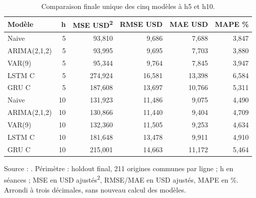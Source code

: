 \begin{table}[!htbp]
\centering
\caption{Comparaison finale unique des cinq modèles à h5 et h10.}
\label{tab:final_metrics}
\small
\setlength{\tabcolsep}{4pt}
\renewcommand{\arraystretch}{1.16}
\begin{tabularx}{\linewidth}{Xrrrrr}
\toprule
\textbf{Modèle} & \textbf{h} & \textbf{MSE USD\textsuperscript{2}} & \textbf{RMSE USD} & \textbf{MAE USD} & \textbf{MAPE \%} \\
\midrule
Naive & 5 & 93,810 & 9,686 & 7,688 & 3,847 \\
ARIMA(2,1,2) & 5 & 93,995 & 9,695 & 7,703 & 3,880 \\
VAR(9) & 5 & 95,344 & 9,764 & 7,845 & 3,947 \\
LSTM C & 5 & 274,924 & 16,581 & 13,398 & 6,584 \\
GRU C & 5 & 187,608 & 13,697 & 10,766 & 5,311 \\
Naive & 10 & 131,923 & 11,486 & 9,075 & 4,490 \\
ARIMA(2,1,2) & 10 & 130,866 & 11,440 & 9,404 & 4,709 \\
VAR(9) & 10 & 132,360 & 11,505 & 9,253 & 4,634 \\
LSTM C & 10 & 181,648 & 13,478 & 9,911 & 4,910 \\
GRU C & 10 & 215,001 & 14,663 & 11,172 & 5,464 \\
\bottomrule
\end{tabularx}
\par\smallskip
\begin{minipage}{\linewidth}\footnotesize Source : . Périmètre : holdout final, 211 origines communes par ligne ; h en séances ; MSE en USD ajustés\textsuperscript{2}, RMSE/MAE en USD ajustés, MAPE en \%. Arrondi à trois décimales, sans nouveau calcul des modèles.
\end{minipage}
\end{table}
